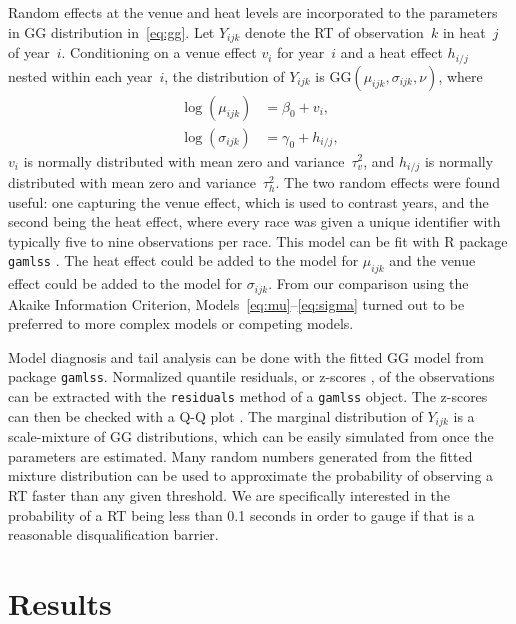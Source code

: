 \documentclass[12pt, letterpaper]{article}
\begin{document}
Random effects at the venue and heat levels are incorporated to the
parameters in GG distribution in~\eqref{eq:gg}.
Let $Y_{ijk}$ denote the RT of observation~$k$ in heat~$j$
of year~$i$. Conditioning on a venue effect $v_i$ for year~$i$
and a heat effect $h_{i/j}$ nested within each year~$i$, the
distribution of $Y_{ijk}$ is
$\text{GG}(\mu_{ijk}, \sigma_{ijk}, \nu)$, where
\begin{align}
\log(\mu_{ijk}) &= \beta_0 + v_i , \label{eq:mu}\\
\log(\sigma_{ijk}) &= \gamma_0 + h_{i/j} , \label{eq:sigma}
\end{align}
$v_i$ is normally distributed with mean zero and
variance~$\tau_v^2$, and $h_{i/j}$ is normally distributed with mean
zero and variance~$\tau_h^2$.
The two random effects were found useful: one 
capturing the venue effect, which is used to contrast years, and the 
second being the heat effect, where every race was given a unique 
identifier with typically five to nine observations per race.
This model can be fit with R package \texttt{gamlss} 
\citep{stasinopoulos2008generalized}. The heat effect could be added
to the model for $\mu_{ijk}$ and the venue effect could be added to 
the model for $\sigma_{ijk}$. From our comparison using the Akaike 
Information Criterion, Models~\eqref{eq:mu}--\eqref{eq:sigma} turned 
out to be preferred to more complex models or competing models.


Model diagnosis and tail analysis can be done with the fitted GG model
from package \texttt{gamlss}. Normalized quantile residuals, or
z-scores \citep{dunn1996randomized}, of the observations can be
extracted with the \texttt{residuals} method of a \texttt{gamlss}
object. The z-scores can then be checked with a Q-Q plot
\citep{almeida2018ggplot2}. The marginal
distribution of $Y_{ijk}$ is a scale-mixture of GG distributions, which can be
easily simulated from once the parameters are estimated. Many
random numbers generated from the fitted mixture distribution can be used to
approximate the probability of observing a RT faster than any given
threshold. We are specifically interested in the probability of a RT
being less than 0.1 seconds in order to gauge if that is a reasonable
disqualification barrier.



\section{Results} \label{sec:Results}
\end{document}
